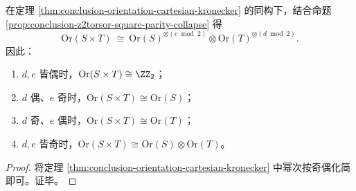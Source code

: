 \begin{corollary}[积取向的二次坍缩与偶度屏蔽]\label{cor:conclusion-orientation-cartesian-parity-collapse}
在定理 \ref{thm:conclusion-orientation-cartesian-kronecker} 的同构下，结合命题 \ref{prop:conclusion-z2torsor-square-parity-collapse} 得
\[
\mathrm{Or}(S\times T)\ \cong\
\mathrm{Or}(S)^{\otimes (e\bmod 2)}
\otimes
\mathrm{Or}(T)^{\otimes (d\bmod 2)}.
\]
因此：
\begin{enumerate}
  \item \(d,e\) 皆偶时，\(\mathrm{Or}(S\times T)\cong \ZZ_2\)；
  \item \(d\) 偶、\(e\) 奇时，\(\mathrm{Or}(S\times T)\cong \mathrm{Or}(S)\)；
  \item \(d\) 奇、\(e\) 偶时，\(\mathrm{Or}(S\times T)\cong \mathrm{Or}(T)\)；
  \item \(d,e\) 皆奇时，\(\mathrm{Or}(S\times T)\cong \mathrm{Or}(S)\otimes\mathrm{Or}(T)\)。
\end{enumerate}
\end{corollary}
\begin{proof}
将定理 \ref{thm:conclusion-orientation-cartesian-kronecker} 中幂次按奇偶化简即可。证毕。
\end{proof}


